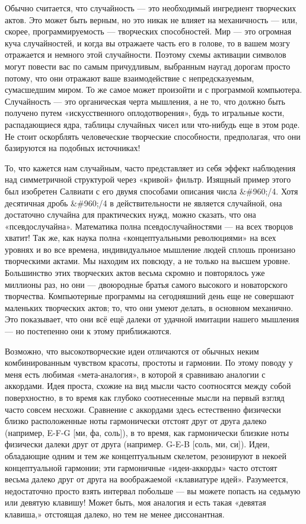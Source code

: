 \documentclass[../main.tex]{subfiles}
\begin{document}
Обычно считается, что случайность --- это необходимый ингредиент творческих актов. Это может быть верным, но это никак не влияет на механичность --- или, скорее, программируемость --- творческих способностей. Мир --- это огромная куча случайностей, и когда вы отражаете часть его в голове, то в вашем мозгу отражается и немного этой случайности. Поэтому схемы активации символов могут повести вас по самым причудливым, выбранным наугад дорогам просто потому, что они отражают ваше взаимодействие с непредсказуемым, сумасшедшим миром. То же самое может произойти и с программой компьютера. Случайность --- это органическая черта мышления, а не то, что должно быть получено путем «искусственного оплодотворения», будь то игральные кости, распадающиеся ядра, таблицы случайных чисел или что-нибудь еще в этом роде. Не стоит оскорблять человеческие творческие способности, предполагая, что они базируются на подобных источниках!

То, что кажется нам случайным, часто представляет из себя эффект наблюдения над симметричной структурой через «кривой» фильтр. Изящный пример этого был изобретен Салвиати с его двумя способами описания числа \&\#960;/4. Хотя десятичная дробь \&\#960;/4 в действительности не является случайной, она достаточно случайна для практических нужд, можно сказать, что она «псевдослучайна». Математика полна псевдослучайностями --- на всех творцов хватит! Так же, как наука полна «концептуальными революциями» на всех уровнях и во все времена, индивидуальное мышление людей сплошь пронизано творческими актами. Мы находим их повсюду, а не только на высшем уровне. Большинство этих творческих актов весьма скромно и повторялось уже миллионы раз, но они --- двоюродные братья самого высокого и новаторского творчества. Компьютерные программы на сегодняшний день еще не совершают маленьких творческих актов; то, что они умеют делать, в основном механично. Это показывает, что они всё ещё далеки от удачной имитации нашего мышления --- но постепенно они к этому приближаются.

Возможно, что высокотворческие идеи отличаются от обычных неким комбинированным чувством красоты, простоты и гармонии. По этому поводу у меня есть любимая «мета-аналогия», в которой я сравниваю аналогии с аккордами. Идея проста, схожие на вид мысли часто соотносятся между собой поверхностно, в то время как глубоко соотнесенные мысли на первый взгляд часто совсем несхожи. Сравнение с аккордами здесь естественно физически близко расположенные ноты гармонически отстоят друг от друга далеко (например, E-F-G {[}ми, фа, соль{]}), в то время, как гармонически близкие ноты физически далеки друг от друга (например. G-E-B {[}соль, ми, си{]}). Идеи, обладающие одним и тем же концептуальным скелетом, резонируют в некоей концептуальной гармонии; эти гармоничные «идеи-аккорды» часто отстоят весьма далеко друг от друга на воображаемой «клавиатуре идей». Разумеется, недостаточно просто взять интервал побольше --- вы можете попасть на седьмую или девятую клавишу! Может быть, моя аналогия и есть такая «девятая клавиша,» отстоящая далеко, но тем не менее диссонантная.
\end{document}
